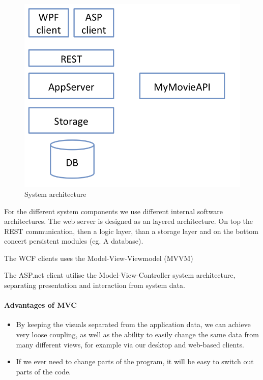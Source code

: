 \begin{figure}[H]
\includegraphics[width=\linewidth]{img/SDD/bdsaproject.png}
\caption{System architecture}
\label{fig:System architecture}
\end{figure}

For the different system components we use different internal software architectures. The web server is designed as an layered architecture. On top the REST communication, then a logic layer, than a storage layer and on the bottom concert persistent modules (eg. A database).

The WCF clients uses the Model-View-Viewmodel (MVVM)


The ASP.net client utilise the Model-View-Controller system architecture, separating presentation and interaction from system data.

\paragraph{Advantages of MVC}
\begin{itemize}
	\item By keeping the visuals separated from the application data, we can achieve very loose coupling, as well as the ability to easily change the same data from many different views, for example via our desktop and web-based clients. \\
	\item If we ever need to change parts of the program, it will be easy to switch out parts of the code.
\end{itemize}
